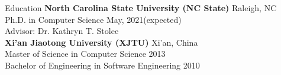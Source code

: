 \documentclass{professional} %
\begin{document}

% 


\begin{rSection}{Education}
{\bf North Carolina State University (NC State)} \hfill {Raleigh, NC} \\
{Ph.D. in Computer Science} \hfill {May, 2021(expected)}\\ 
{Advisor: Dr. Kathryn T. Stolee} \\ 
{\bf Xi'an Jiaotong University (XJTU)} \hfill {Xi'an, China}\\ 
{Master of Science in Computer Science} \hfill {2013}\\ 
{Bachelor of Engineering in Software Engineering} \hfill {2010}\\ 


\end{rSection} 
\end{document}
